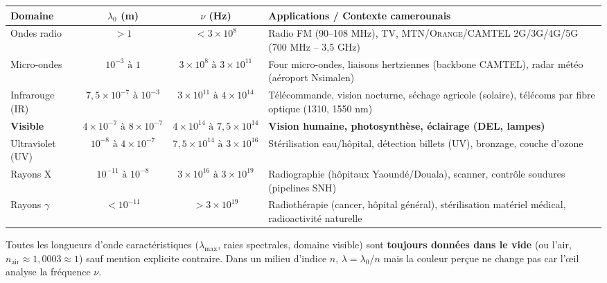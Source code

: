 \documentclass[11pt]{article}
\begin{document}
\begin{aretenir}
\begin{center}
\begin{tabularx}{\linewidth}{|l|c|c|X|}
\hline
\rowcolor{popblueL} \textbf{Domaine} & \textbf{$\lambda_0$ (m)} & \textbf{$\nu$ (Hz)} & \textbf{Applications / Contexte camerounais} \\
\hline
Ondes radio & $> 1$ & $< 3 \times 10^8$ & Radio FM (90--108 MHz), TV, \textsc{MTN}/\textsc{Orange}/\textsc{CAMTEL} 2G/3G/4G/5G (700 MHz -- 3,5 GHz) \\
Micro-ondes & $10^{-3} \text{ à } 1$ & $3 \times 10^8 \text{ à } 3 \times 10^{11}$ & Four micro-ondes, liaisons hertziennes (backbone \textsc{CAMTEL}), radar météo (aéroport Nsimalen) \\
Infrarouge (IR) & $7,5 \times 10^{-7} \text{ à } 10^{-3}$ & $3 \times 10^{11} \text{ à } 4 \times 10^{14}$ & Télécommande, vision nocturne, séchage agricole (solaire), télécoms par fibre optique (1310, 1550 nm) \\
\rowcolor{popyellow!30} \textbf{Visible} & \textbf{$4 \times 10^{-7} \text{ à } 8 \times 10^{-7}$} & \textbf{$4 \times 10^{14} \text{ à } 7,5 \times 10^{14}$} & \textbf{Vision humaine, photosynthèse, éclairage (DEL, lampes)} \\
Ultraviolet (UV) & $10^{-8} \text{ à } 4 \times 10^{-7}$ & $7,5 \times 10^{14} \text{ à } 3 \times 10^{16}$ & Stérilisation eau/hôpital, détection billets (UV), bronzage, couche d'ozone \\
Rayons X & $10^{-11} \text{ à } 10^{-8}$ & $3 \times 10^{16} \text{ à } 3 \times 10^{19}$ & Radiographie (hôpitaux Yaoundé/Douala), scanner, contrôle soudures (pipelines \textsc{SNH}) \\
Rayons $\gamma$ & $< 10^{-11}$ & $> 3 \times 10^{19}$ & Radiothérapie (cancer, hôpital général), stérilisation matériel médical, radioactivité naturelle \\
\hline
\end{tabularx}
\end{center}
\end{aretenir}

\begin{attention}
Toutes les longueurs d'onde caractéristiques ($\lambda_{\max}$, raies spectrales, domaine visible) sont \textbf{toujours données dans le vide} (ou l'air, $n_{\text{air}} \approx 1,0003 \approx 1$) sauf mention explicite contraire. Dans un milieu d'indice $n$, $\lambda = \lambda_0/n$ mais la couleur perçue ne change pas car l'œil analyse la fréquence $\nu$.
\end{attention}
\end{document}
